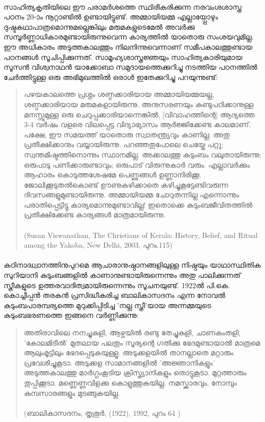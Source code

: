 \paragraph{}സാഹിത്യകൃതിയിലെ ഈ പരാമർശത്തെ സ്ഥിരീകരിക്കുന്ന നരവംശശാസ്ത്ര പഠനം 20-ാം നൂറ്റാണ്ടിൽ ഉണ്ടായിട്ടുണ്ട്. അമ്മായിയമ്മ എല്ലായ്പ്പോഴും ദുഷ്ടകഥാപാത്രമൊന്നുമല്ലെങ്കിലും മരുമകളുടെമേൽ അവർക്കു സമ്പൂർണ്ണാധികാരമുണ്ടായിരുന്നുവെന്ന കാര്യത്തിൽ യാതൊരു സംശയവുമില്ല. ഈ അധികാരം അടുത്തകാലത്തും നിലനിന്നുവെന്നാണ് സമീപകാലത്തുണ്ടായ പഠനങ്ങൾ സൂചിപ്പിക്കുന്നത്. സാമൂഹ്യശാസ്ത്രജ്ഞയും സാഹിത്യകാരിയുമായ സൂസൻ വിശ്വനാഥൻ യാക്കോബാ സമുദായത്തെക്കുറിച്ചു നടത്തിയ പഠനത്തിൽ ചേർത്തിട്ടുള്ള ഒരു അഭിമുഖത്തിൽ ഒരാൾ ഇതേക്കുറിച്ചു പറയുന്നുണ്ട്:
\begin{quotation}
\noindent പഴയകാലത്തെ പ്രശ്നം ശണ്ഠക്കാരിയായ അമ്മായിയമ്മയല്ല, ശണ്ഠക്കാരിയായ മരുമകളായിരുന്നു. അനുസരണയും കണ്ടുപഠിക്കാനുള്ള മനസ്സുമുള്ള ഒരു ചെറുപ്പക്കാരിയാന്നെങ്കിൽ, [വിവാഹത്തിന്റെ] ആദ്യത്തെ 3-4 വർഷം വളരെ വിലപ്പെട്ട വിദ്യാഭ്യാസം ആർജ്ജിക്കേണ്ട കാലമാണ്. പക്ഷേ, ഈ സമയത്ത് യാതൊരു സ്വാതന്ത്ര്യവും കാണില്ല; അതു പ്രതീക്ഷിക്കാനും വയ്യായിരുന്നു. പറഞ്ഞതുപോലെ ചെയ്തേ പറ്റൂ; സ്വന്തമിഷ്ടത്തിനൊന്നും സ്ഥാനമില്ല. അക്കാലത്തു കുടുംബം വലുതായിരുന്നു; ഒരുപാടു പണിക്കാരുണ്ടാവും; ഒരുപാട് വിരുന്നുകാർ വരും. എല്ലാവർക്കും ആഹാരം കൊടുത്തശേഷമേ പെണ്ണുങ്ങൾ ഉണ്ണാനിരിക്കൂ. ജോലിക്കൂടുതൽകൊണ്ട് ഊണുകഴിക്കാതെ കഴിച്ചുകൂട്ടേണ്ടിവരുന്ന ദിവസങ്ങളുമുണ്ടായിരുന്നു. അമ്മായിയമ്മ ചോറുതന്നില്ല എന്നൊന്നും പരാതിപ്പെട്ടിട്ടു കാര്യമൊന്നുമുണ്ടാവില്ല! ഇതൊക്കെ കുടുംബജീവിതത്തിൽ പ്രതീക്ഷിക്കേണ്ട കാര്യങ്ങൾ മാത്രമായിരുന്നു.\\
\\(Susan Viswanathan, The Christians of Kerala: History, Belief, and Ritual among the Yakoba, New Delhi, 2003, പുറം.115)
\end{quotation}
\paragraph{}കഠിനാദ്ധ്വാനത്തിനുപുറമെ ആചാരാനുഷ്ഠാനങ്ങളിലുള്ള നിഷ്ഠയും യാഥാസ്ഥിതിക സുറിയാനി കുടുംബങ്ങളിൽ കാണാനുണ്ടായിരുന്നെന്നും അതു പാലിക്കുന്നത് സ്ത്രീകളുടെ ഉത്തരവാദിത്വമായിരുന്നെന്നും സൂചനയുണ്ട്. 1922ൽ പി.കെ. കൊച്ചീപ്പൻ തരകൻ പ്രസിദ്ധീകരിച്ച ബാലികാസദനം എന്ന നോവൽ കുടുംബപാരമ്പര്യത്തെ മുറുക്കിപ്പിടിച്ച 'നല്ല സ്ത്രീ'യായ അന്നമ്മയുടെ കുടുംബഭരണത്തെ ഇങ്ങനെ വർണ്ണിക്കുന്നു:
\begin{quotation}
\noindent അതിരാവിലെ നനച്ചുകുളി, ആഴ്ചയിൽ രണ്ടു തേച്ചുകുളി, ചാണകംതളി, 'കോലമിടീൽ' മുതലായ പലതും സൂര്യന്റെ ഗതിക്കു ഭേദമുണ്ടായാൽ മാത്രമെ ആലുംമൂട്ടിലും ഭേദപ്പെടുകയുള്ളൂ. അടുക്കളയിൽ താനല്ലാതെ മറ്റാരും പ്രവേശിച്ചുകൂടാ. അടുക്കള സാമാനങ്ങളിൽ 'അജ്ഞാനികളും' അടുത്തകാലത്തു മാർഗ്ഗംകൂടിയ ക്രിസ്ത്യാനികളും തൊട്ടുകൂടാ. മുറ്റത്താരും തുപ്പിക്കൂടാ. മണ്ണെണ്ണവിളക്കു കൊളുത്തുകയില്ല. നമസ്ക്കാരവും, നോമ്പും കുമ്പസാരങ്ങളും മുടങ്ങുകയില്ല.\\
\\(ബാലികാസദനം, തൃശൂർ, (1922), 1992, പുറം 64 )
\end{quotation}
